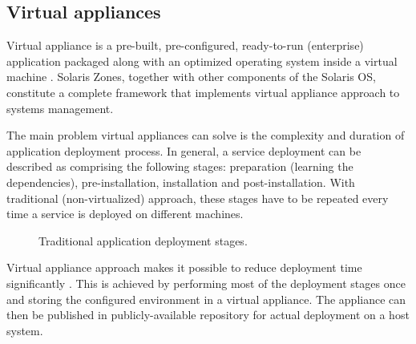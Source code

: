 \documentclass[11pt]{book}
\begin{document}


      \subsection{Virtual appliances}
      \label{sub:}

        Virtual appliance is a pre-built, pre-configured, ready-to-run (enterprise) application packaged along with an
        optimized operating system inside a virtual machine \cite{changhua}. Solaris Zones, together with other
        components of the Solaris OS, constitute a complete framework that implements virtual appliance approach to
        systems management.  %

        The main problem virtual appliances can solve is the complexity and duration of application deployment process.
        In general, a service deployment can be described as comprising the following stages: preparation (learning the
        dependencies), pre-installation, installation and post-installation. With traditional (non-virtualized)
        approach, these stages have to be repeated every time a service is deployed on different machines.

        \begin{figure}[H]
          \begin{center}
          \end{center}

          \caption{Traditional application deployment stages.}
        \end{figure}


        Virtual appliance approach makes it possible to reduce deployment time significantly \cite{changhua}. This is
        achieved by performing most of the deployment stages once and storing the configured environment in a virtual
        appliance. The appliance can then be published in publicly-available repository for actual deployment on a host
        system.
\end{document}
